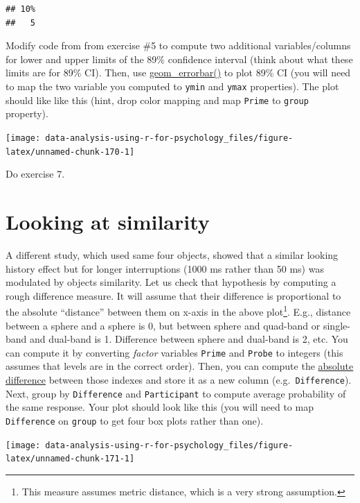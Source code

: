 \documentclass[
]{book}
\begin{document}
\begin{verbatim}
## 10% 
##   5
\end{verbatim}

Modify code from from exercise \#5 to compute two additional variables/columns for lower and upper limits of the 89\% confidence interval (think about what these limits are for 89\% CI). Then, use \href{https://ggplot2.tidyverse.org/reference/geom_linerange.html}{geom\_errorbar()} to plot 89\% CI (you will need to map the two variable you computed to \texttt{ymin} and \texttt{ymax} properties). The plot should like like this (hint, drop color mapping and map \texttt{Prime} to \texttt{group} property).

\begin{center}\texttt{[image: data-analysis-using-r-for-psychology\_files/figure-latex/unnamed-chunk-170-1]} \end{center}

Do exercise 7.

\hypertarget{looking-at-similarity}{%
\section{Looking at similarity}\label{looking-at-similarity}}

A different study, which used same four objects, showed that a similar looking history effect but for longer interruptions (1000 ms rather than 50 ms) was modulated by objects similarity. Let us check that hypothesis by computing a rough difference measure. It will assume that their difference is proportional to the absolute ``distance'' between them on x-axis in the above plot\footnote{This measure assumes metric distance, which is a very strong assumption.}. E.g., distance between a sphere and a sphere is 0, but between sphere and quad-band or single-band and dual-band is 1. Difference between sphere and dual-band is 2, etc. You can compute it by converting \emph{factor} variables \texttt{Prime} and \texttt{Probe} to integers (this assumes that levels are in the correct order). Then, you can compute the \href{https://stat.ethz.ch/R-manual/R-devel/library/base/html/MathFun.html}{absolute difference} between those indexes and store it as a new column (e.g.~\texttt{Difference}). Next, group by \texttt{Difference} and \texttt{Participant} to compute average probability of the same response. Your plot should look like this (you will need to map \texttt{Difference} on \texttt{group} to get four box plots rather than one).

\begin{center}\texttt{[image: data-analysis-using-r-for-psychology\_files/figure-latex/unnamed-chunk-171-1]} \end{center}
\end{document}
